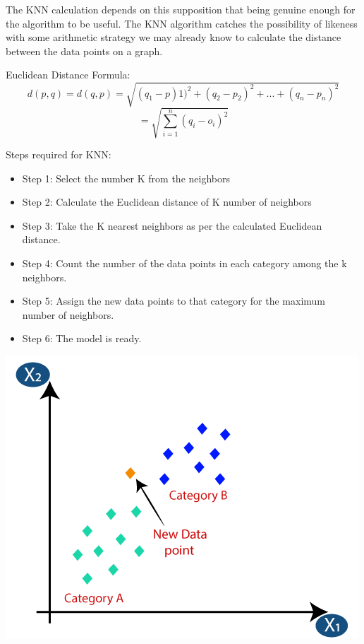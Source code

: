 \documentclass[a4paper,12pt]{report}
\begin{document}
The KNN calculation depends on this supposition that being genuine enough for the algorithm to be useful. The KNN algorithm catches the possibility of likeness with some arithmetic strategy we may already know to calculate the distance between the data points on a graph.

Euclidean Distance Formula:
$$d(p,q)=d(q,p)=\sqrt{(q_1-p)1)^2+(q_2-p_2)^2+...+(q_n-p_n)^2}$$
$$=\sqrt{\sum_{i=1}^n(q_i-o_i)^2}$$

Steps required for KNN:
\vspace*{-.9cm}
\begin{itemize}[,]
    \setlength\itemsep{-.1cm}
    \item Step 1: Select the number K from the neighbors
    \item Step 2: Calculate the Euclidean distance of K number of neighbors
    \item Step 3: Take the K nearest neighbors as per the calculated Euclidean distance.
    \item Step 4: Count the number of the data points in each category among the k neighbors.
    \item Step 5: Assign the new data points to that category for the maximum number of neighbors.
    \item Step 6: The model is ready.
\end{itemize}

\begin{center}
    \captionsetup{type=figure}
    \includegraphics[width=.9\linewidth]{media/datacategories.png}
\end{center}
\end{document}
